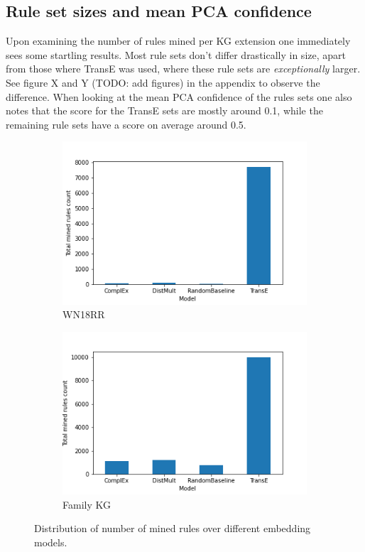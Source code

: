 \subsection{Rule set sizes and mean PCA confidence}
\label{TransE_sucks} 
Upon examining the number of rules mined per KG extension one immediately sees some startling results. Most rule sets don't differ drastically in size, apart from those where TransE was used, where these rule sets are \textit{exceptionally} larger. See figure X and Y (TODO: add figures) in the appendix to observe the difference. When looking at the mean PCA confidence of the rules sets one also notes that the score for the TransE sets are mostly around 0.1, while the remaining rule sets have a score on average around 0.5.

\begin{figure}[h]
\centering
\begin{subfigure}{.5\textwidth}
  \centering
  \includegraphics[width=1\linewidth]{figures/results/Total_mined_rules-model-wn18rr.png}
  \caption{WN18RR}
  \label{fig:sub1}
\end{subfigure}%
\begin{subfigure}{.5\textwidth}
  \centering
  \includegraphics[width=1\linewidth]{figures/results/Total_mined_rules-model-family.png}
  \caption{Family KG}
  \label{fig:sub2}
\end{subfigure}
\caption{Distribution of number of mined rules over different embedding models.}
\label{fig:test}
\end{figure}

